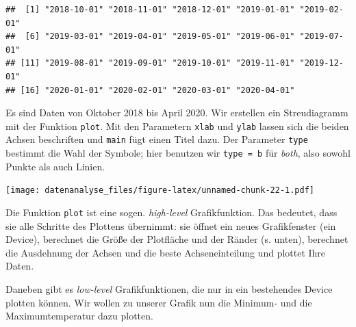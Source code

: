 \documentclass[]{book}
\newenvironment{Shaded}{\begin{snugshade}}{\end{snugshade}}
\newcommand{\DataTypeTok}[1]{\textcolor[rgb]{0.13,0.29,0.53}{#1}}
\newcommand{\KeywordTok}[1]{\textcolor[rgb]{0.13,0.29,0.53}{\textbf{#1}}}
\newcommand{\NormalTok}[1]{#1}
\newcommand{\OperatorTok}[1]{\textcolor[rgb]{0.81,0.36,0.00}{\textbf{#1}}}
\newcommand{\StringTok}[1]{\textcolor[rgb]{0.31,0.60,0.02}{#1}}
\begin{document}
\begin{Shaded}
\end{Shaded}

\begin{verbatim}
##  [1] "2018-10-01" "2018-11-01" "2018-12-01" "2019-01-01" "2019-02-01"
##  [6] "2019-03-01" "2019-04-01" "2019-05-01" "2019-06-01" "2019-07-01"
## [11] "2019-08-01" "2019-09-01" "2019-10-01" "2019-11-01" "2019-12-01"
## [16] "2020-01-01" "2020-02-01" "2020-03-01" "2020-04-01"
\end{verbatim}

Es sind Daten von Oktober 2018 bis April 2020. Wir erstellen ein Streudiagramm mit der Funktion \texttt{plot}. Mit den Parametern \texttt{xlab} und \texttt{ylab} lassen sich die beiden Achsen beschriften und \texttt{main} fügt einen Titel dazu. Der Parameter \texttt{type} bestimmt die Wahl der Symbole; hier benutzen wir \texttt{type\ =\ b} für \emph{both}, also sowohl Punkte als auch Linien.

\begin{Shaded}
\end{Shaded}

\texttt{[image: datenanalyse\_files/figure-latex/unnamed-chunk-22-1.pdf]}

Die Funktion \texttt{plot} ist eine sogen. \emph{high-level} Grafikfunktion. Das bedeutet, dass sie alle Schritte des Plottens übernimmt: sie öffnet ein neues Grafikfenster (ein Device), berechnet die Größe der Plotfläche und der Ränder (s. unten), berechnet die Ausdehnung der Achsen und die beste Achseneinteilung und plottet Ihre Daten.

Daneben gibt es \emph{low-level} Grafikfunktionen, die nur in ein bestehendes Device plotten können. Wir wollen zu unserer Grafik nun die Minimum- und die Maximumtemperatur dazu plotten.
\end{document}
